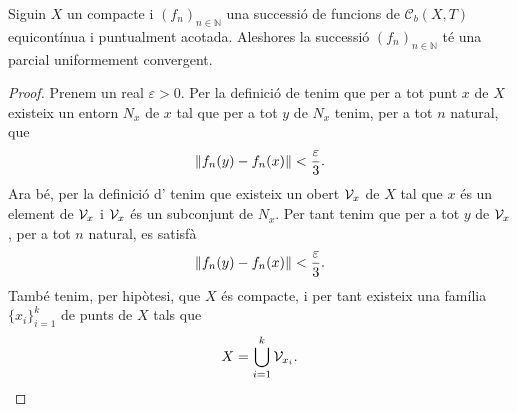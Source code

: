 \documentclass[../../Main.tex]{subfiles}
\begin{document}
	\begin{lemma}
		\label{thm:Teorema d'Arzelà-Ascoli}
		Siguin \(X\) un compacte i \((f_{n})_{n\in\mathbb{N}}\) una successió de funcions de \(\mathcal{C}_{b}(X,T)\) equicontínua i puntualment acotada.
		Aleshores la successió \((f_{n})_{n\in\mathbb{N}}\) té una parcial uniformement convergent.
		\begin{proof}
			Prenem un real \(\varepsilon>0\).
			Per la definició de  tenim que per a tot punt \(x\) de \(X\) existeix un entorn \(N_{x}\) de \(x\) tal que per a tot \(y\) de \(N_{x}\) tenim, per a tot \(n\) natural, que
			\[
			    \norm{f_{n}(y)-f_{n}(x)}<\frac{\varepsilon}{3}.
			\]
			Ara bé, per la definició d' tenim que existeix un obert \(\mathcal{V}_{x}\) de \(X\) tal que \(x\) és un element de \(\mathcal{V}_{x}\) i \(\mathcal{V}_{x}\) és un subconjunt de \(N_{x}\).
			Per tant tenim que per a tot \(y\) de \(\mathcal{V}_{x}\), per a tot \(n\) natural, es satisfà
			\begin{equation}
				\label{thm:Teorema d'Arzelà-Ascoli:eq2}
				\norm{f_{n}(y)-f_{n}(x)}<\frac{\varepsilon}{3}.
			\end{equation}
			També tenim, per hipòtesi, que \(X\) és compacte, i per tant existeix una família \(\{x_{i}\}_{i=1}^{k}\) de punts de \(X\) tals que
			\begin{equation}
				\label{thm:Teorema d'Arzelà-Ascoli:eq1}
				X=\bigcup_{i=1}^{k}\mathcal{V}_{x_{i}}.
			\end{equation}
			

\end{proof}
\end{lemma}
\end{document}
